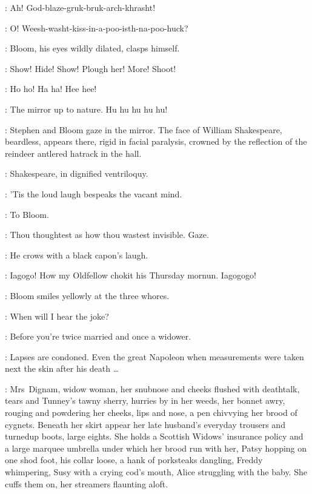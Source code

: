 \BoylansVoice:
Ah!
God-blaze-gruk-bruk-arch-khrasht!%

\MarionsVoice:
O!
Weesh-washt-kiss-in-a-poo-isth-na-poo-huck?

:
Bloom, his eyes wildly dilated, clasps himself.

\Bloom:
Show! Hide! Show!
Plough her!
More!
Shoot!

\BellaZoeFlorryKitty:
Ho ho!
Ha ha!
Hee hee!

\Lynch:
The mirror up to nature.
Hu hu hu hu hu!

:
Stephen and Bloom gaze in the mirror.
The face of William Shakespeare,
beardless, appears there, rigid in facial paralysis,
crowned by the reflection of the reindeer antlered hatrack in the hall.

:
Shakespeare, in dignified ventriloquy.

\Shakespeare:
'Tis the loud laugh bespeaks the vacant mind.

:
To Bloom.

\Shakespeare:
Thou thoughtest as how thou wastest invisible.
Gaze.

:
He crows with a black capon's laugh.

\Shakespeare:
Iagogo!
How my Oldfellow chokit his Thursday mornun.
Iagogogo!

:
Bloom smiles yellowly at the three whores.

\Bloom:
When will I hear the joke?

\Zoe:
Before you're twice married and once a widower.

\Bloom:
Lapses are condoned.
Even the great Napoleon when measurements
were taken next the skin after his death \ldots

:
Mrs~Dignam, widow woman, her snubnose and cheeks flushed with deathtalk,
tears and Tunney's tawny sherry, hurries by in her weeds,
her bonnet awry, rouging and powdering her cheeks, lips and nose,
a pen chivvying her brood of cygnets.
Beneath her skirt appear her late husband's
everyday trousers and turnedup boots, large eights.
She holds a Scottish Widows' insurance policy and a large marquee umbrella
under which her brood run with her,
Patsy hopping on one shod foot,
his collar loose, a hank of porksteaks dangling,
Freddy whimpering,
Susy with a crying cod's mouth,
Alice struggling with the baby.
She cuffs them on, her streamers flaunting aloft.

